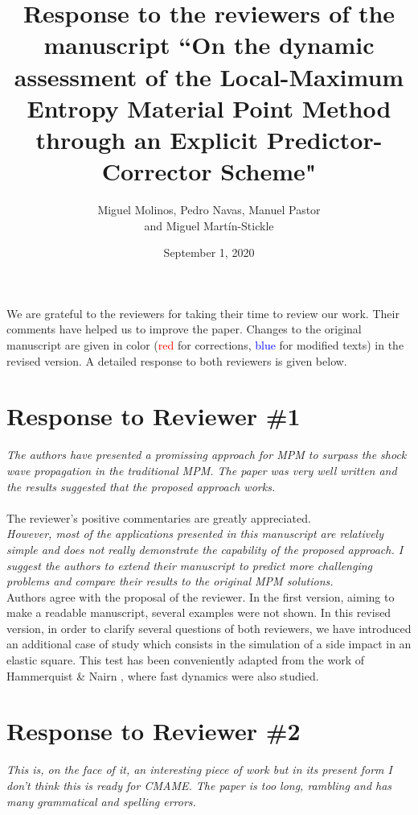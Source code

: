 \documentclass[12pt]{article}
\title{Response to the reviewers of the manuscript ``On the dynamic assessment of the Local-Maximum Entropy Material Point Method through an Explicit Predictor-Corrector Scheme"}
\author{Miguel Molinos, Pedro Navas, Manuel Pastor\\
and Miguel Mart\'in-Stickle}
\date{September 1, 2020}
\begin{document}
\maketitle

We  are grateful to the reviewers for taking their time  to review our work. Their comments have helped us to improve the paper. Changes to the original manuscript are given in  color (\textcolor{red}{red} for corrections, \textcolor{blue}{blue} for modified texts)  in the revised version.  A detailed response to both reviewers is given below.

\section*{Response to Reviewer \#1}
{\it
The authors have presented a promissing approach for MPM to surpass the shock wave propagation in the traditional MPM. The paper was very well written and the results suggested that the proposed approach works.
}
\\
\\
The reviewer's positive commentaries are greatly appreciated.
\\
\textit{However, most of the applications presented in this manuscript are relatively simple and does not really demonstrate the capability of the proposed approach. I suggest the authors to extend their manuscript to predict more challenging problems and compare their results to the original MPM solutions.}\\

Authors agree with the proposal of the reviewer. In the first version, aiming to make a readable manuscript, several examples were not shown. In this revised version, in order to clarify several questions of both reviewers, we have introduced an additional case of study which consists in the simulation of a side impact in an elastic square. This test has been conveniently adapted from the work of Hammerquist \& Nairn \cite{HAMMERQUIST2017724}, where fast dynamics were also studied.

\hspace{5mm}



\section*{Response to Reviewer \#2}

\textit {This is, on the face of it, an interesting piece of work but in its present form I don't think this is ready for CMAME. The paper is too long, rambling and has many grammatical and spelling errors. }\\
\end{document}

